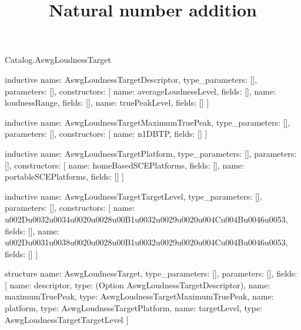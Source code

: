\begin{lexlean}{Catalog.AswgLoudnessTarget}
\title{Natural number addition}
\begin{semanticmodule}
inductive{
  name: AswgLoudnessTargetDescriptor,
  type_parameters: [],
  parameters: [],
  constructors: [
    {name: averageLoudnessLevel, fields: []},
    {name: loudnessRange, fields: []},
    {name: truePeakLevel, fields: []}
  ]
}

inductive{
  name: AswgLoudnessTargetMaximumTruePeak,
  type_parameters: [],
  parameters: [],
  constructors: [
    {name: n1DBTP, fields: []}
  ]
}

inductive{
  name: AswgLoudnessTargetPlatform,
  type_parameters: [],
  parameters: [],
  constructors: [
    {name: homeBasedSCEPlatforms, fields: []},
    {name: portableSCEPlatforms, fields: []}
  ]
}

inductive{
  name: AswgLoudnessTargetTargetLevel,
  type_parameters: [],
  parameters: [],
  constructors: [
    {name: u002Du0032u0034u0020u0028u00B1u0032u0029u0020u004Cu004Bu0046u0053, fields: []},
    {name: u002Du0031u0038u0020u0028u00B1u0032u0029u0020u004Cu004Bu0046u0053, fields: []}
  ]
}

structure{
  name: AswgLoudnessTarget,
  type_parameters: [],
  parameters: [],
  fields: [
    {name: descriptor, type: (Option AswgLoudnessTargetDescriptor)},
    {name: maximumTruePeak, type: AswgLoudnessTargetMaximumTruePeak},
    {name: platform, type: AswgLoudnessTargetPlatform},
    {name: targetLevel, type: AswgLoudnessTargetTargetLevel}
  ]
}
\end{semanticmodule}
\end{lexlean}

